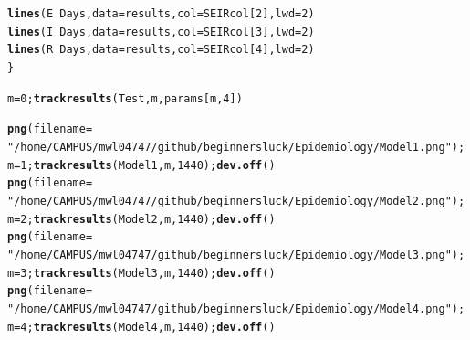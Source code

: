 \documentclass{article}\usepackage[]{graphicx}\usepackage[]{color}
\makeatletter
\newcommand{\hlnum}[1]{\textcolor[rgb]{0.686,0.059,0.569}{#1}}%
\newcommand{\hlstr}[1]{\textcolor[rgb]{0.192,0.494,0.8}{#1}}%
\newcommand{\hlopt}[1]{\textcolor[rgb]{0,0,0}{#1}}%
\newcommand{\hlstd}[1]{\textcolor[rgb]{0.345,0.345,0.345}{#1}}%
\newcommand{\hlkwb}[1]{\textcolor[rgb]{0.69,0.353,0.396}{#1}}%
\newcommand{\hlkwc}[1]{\textcolor[rgb]{0.333,0.667,0.333}{#1}}%
\newcommand{\hlkwd}[1]{\textcolor[rgb]{0.737,0.353,0.396}{\textbf{#1}}}%
\newenvironment{kframe}{%
 \def\at@end@of@kframe{}%
 \ifinner\ifhmode%
  \def\at@end@of@kframe{\end{minipage}}%
  \begin{minipage}{\columnwidth}%
 \fi\fi%
 \def\FrameCommand##1{\hskip\@totalleftmargin \hskip-\fboxsep
 \colorbox{shadecolor}{##1}\hskip-\fboxsep
     \hskip-\linewidth \hskip-\@totalleftmargin \hskip\columnwidth}%
 \MakeFramed {\advance\hsize-\width
   \@totalleftmargin\z@ \linewidth\hsize
   \@setminipage}}%
 {\par\unskip\endMakeFramed%
 \at@end@of@kframe}
\newenvironment{knitrout}{}{} %
\makeatother
\begin{document}
\begin{knitrout}
\begin{kframe}
\begin{alltt}
\hlkwd{lines}\hlstd{(E}\hlopt{~}\hlstd{Days,} \hlkwc{data}\hlstd{=results,} \hlkwc{col}\hlstd{=SEIRcol[}\hlnum{2}\hlstd{],} \hlkwc{lwd}\hlstd{=}\hlnum{2}\hlstd{)}
\hlkwd{lines}\hlstd{(I}\hlopt{~}\hlstd{Days,} \hlkwc{data}\hlstd{=results,} \hlkwc{col}\hlstd{=SEIRcol[}\hlnum{3}\hlstd{],} \hlkwc{lwd}\hlstd{=}\hlnum{2}\hlstd{)}
\hlkwd{lines}\hlstd{(R}\hlopt{~}\hlstd{Days,} \hlkwc{data}\hlstd{=results,} \hlkwc{col}\hlstd{=SEIRcol[}\hlnum{4}\hlstd{],} \hlkwc{lwd}\hlstd{=}\hlnum{2}\hlstd{)}
\hlstd{\}}

\hlstd{m} \hlkwb{=} \hlnum{0}\hlstd{;} \hlkwd{trackresults}\hlstd{(Test, m, params[m,}\hlnum{4}\hlstd{])}

\hlkwd{png}\hlstd{(}\hlkwc{filename} \hlstd{=}
  \hlstr{"/home/CAMPUS/mwl04747/github/beginnersluck/Epidemiology/Model1.png"}\hlstd{);}
  \hlstd{m} \hlkwb{=} \hlnum{1}\hlstd{;} \hlkwd{trackresults}\hlstd{(Model1, m,} \hlnum{1440}\hlstd{);} \hlkwd{dev.off}\hlstd{()}
\hlkwd{png}\hlstd{(}\hlkwc{filename} \hlstd{=}
  \hlstr{"/home/CAMPUS/mwl04747/github/beginnersluck/Epidemiology/Model2.png"}\hlstd{);}
  \hlstd{m} \hlkwb{=} \hlnum{2}\hlstd{;} \hlkwd{trackresults}\hlstd{(Model2, m,} \hlnum{1440}\hlstd{);} \hlkwd{dev.off}\hlstd{()}
\hlkwd{png}\hlstd{(}\hlkwc{filename} \hlstd{=}
  \hlstr{"/home/CAMPUS/mwl04747/github/beginnersluck/Epidemiology/Model3.png"}\hlstd{);}
  \hlstd{m} \hlkwb{=} \hlnum{3}\hlstd{;} \hlkwd{trackresults}\hlstd{(Model3, m,} \hlnum{1440}\hlstd{);} \hlkwd{dev.off}\hlstd{()}
\hlkwd{png}\hlstd{(}\hlkwc{filename} \hlstd{=}
  \hlstr{"/home/CAMPUS/mwl04747/github/beginnersluck/Epidemiology/Model4.png"}\hlstd{);}
  \hlstd{m} \hlkwb{=} \hlnum{4}\hlstd{;} \hlkwd{trackresults}\hlstd{(Model4, m,} \hlnum{1440}\hlstd{);} \hlkwd{dev.off}\hlstd{()}
\end{alltt}
\end{kframe}
\end{knitrout}
\end{document}
